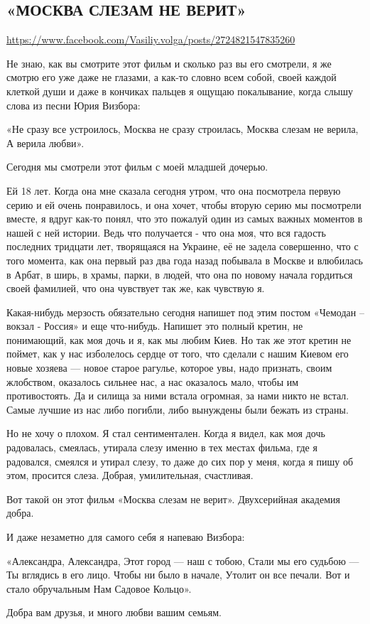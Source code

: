  
 

\subsection{«МОСКВА СЛЕЗАМ НЕ ВЕРИТ»}
\label{sec:18_10_2020.fb.vasiliy.volga.1.moskva}

\url{https://www.facebook.com/Vasiliy.volga/posts/2724821547835260}

Не знаю, как вы смотрите этот фильм и сколько раз вы его смотрели, я же смотрю
его уже даже не глазами, а как-то словно всем собой, своей каждой клеткой души
и даже в кончиках пальцев я ощущаю покалывание, когда слышу слова из песни Юрия
Визбора:

«Не сразу все устроилось,
Москва не сразу строилась,
Москва слезам не верила,
А верила любви».

Сегодня мы смотрели этот фильм с моей младшей дочерью.

Ей 18 лет. Когда она мне сказала сегодня утром, что она посмотрела первую серию
и ей очень понравилось, и она хочет, чтобы вторую серию мы посмотрели вместе, я
вдруг как-то понял, что это пожалуй один из самых важных моментов в нашей с ней
истории. Ведь что получается - что она моя, что вся гадость последних тридцати
лет, творящаяся на Украине, её не задела совершенно, что с того момента, как
она первый раз два года назад побывала в Москве и влюбилась в Арбат, в ширь, в
храмы, парки, в людей, что она по новому начала гордиться своей фамилией, что
она чувствует так же, как чувствую я.

Какая-нибудь мерзость обязательно сегодня напишет под этим постом «Чемодан –
вокзал - Россия» и еще что-нибудь. Напишет это полный кретин, не понимающий,
как моя дочь и я, как мы любим Киев. Но так же этот кретин не поймет, как у нас
изболелось сердце от того, что сделали с нашим Киевом его новые хозяева --- новое
старое рагулье, которое увы, надо признать, своим жлобством, оказалось сильнее
нас, а нас оказалось мало, чтобы им противостоять. Да и силища за ними встала
огромная, за нами никто не встал. Самые лучшие из нас либо погибли, либо
вынуждены были бежать из страны.

Но не хочу о плохом. Я стал сентиментален. Когда я видел, как моя дочь
радовалась, смеялась, утирала слезу именно в тех местах фильма, где я
радовался, смеялся и утирал слезу, то даже до сих пор у меня, когда я пишу об
этом, просится слеза. Добрая, умилительная, счастливая.

Вот такой он этот фильм «Москва слезам не верит». Двухсерийная академия добра.

И даже незаметно для самого себя я напеваю Визбора:

«Александра, Александра,
Этот город --- наш с тобою,
Стали мы его судьбою —
Ты вглядись в его лицо.
Чтобы ни было в начале,
Утолит он все печали.
Вот и стало обручальным
Нам Садовое Кольцо».

Добра вам друзья, и много любви вашим семьям.
